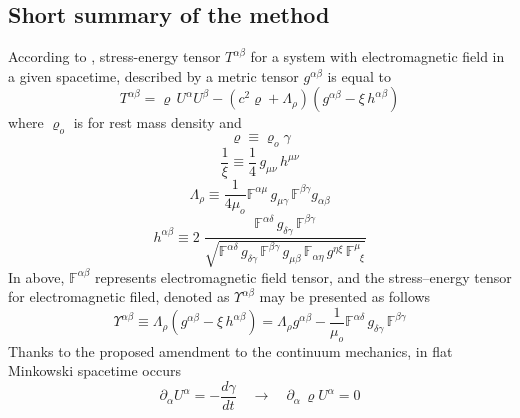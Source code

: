 \documentclass[aps,prx,preprint,groupedaddress,showkeys]{revtex4-2}
\newcommand{\mdt}[1] {\frac{d {#1}}{dt}}
\begin{document}
\subsection{Short summary of the method} \label{ShortSummary}

According to \cite{PMofC}, stress-energy tensor $T^{\alpha \beta}$ for a system with electromagnetic field in a given spacetime, described by a metric tensor $g^{\alpha \beta}$ is equal to
\begin{equation} \label{CH2}
T^{\alpha \beta} =  \varrho \, U^{\alpha} U^{\beta} - \left ( c^2 \varrho +  \Lambda_{\rho}  \right ) \left ( g^{\alpha \beta} - \xi \, h^{\alpha \beta} \right )
\end{equation}
where $\varrho_o$ is for rest mass density and
\begin{equation} \label{VRD}
\varrho \equiv \varrho_o \gamma
\end{equation}
\begin{equation} \label{CH4}
\frac{1}{\xi} \equiv \frac{1}{4}\, g_{\mu \nu} \, h^{\mu \nu}
\end{equation}
\begin{equation} \label{CH5}
\Lambda_{\rho} \equiv \frac{1}{4\mu_o} \mathbb{F}^{\alpha \mu} \, g_{\mu \gamma} \, \mathbb{F}^{ \beta \gamma } g_{\alpha \beta}
\end{equation}
\begin{equation} \label{CH6}
h^{\alpha \beta} \equiv 2 \; \frac{\mathbb{F}^{\alpha \delta} \, g_{\delta \gamma} \, \mathbb{F}^{ \beta \gamma } }{ \sqrt{\mathbb{F}^{\alpha \delta} \, g_{\delta \gamma} \, \mathbb{F}^{ \beta \gamma } \, g_{\mu \beta} \, \mathbb{F}_{\alpha \eta} \, g^{\eta \xi} \, \mathbb{F}^{\mu}_{\; \; \xi }}}
\end{equation}
In above, $\mathbb{F}^{\alpha \beta}$ represents electromagnetic field tensor, and the stress–energy tensor for electromagnetic filed, denoted as $\Upsilon^{\alpha \beta}$ may be presented as follows
\begin{equation} \label{CH7}
\Upsilon^{\alpha \beta} \equiv  \Lambda_{\rho} \left (g^{\alpha \beta} - \xi \, h^{\alpha \beta}  \right ) = \Lambda_{\rho} g^{\alpha \beta} - \frac{1}{\mu_o}\mathbb{F}^{\alpha \delta} \, g_{\delta \gamma} \, \mathbb{F}^{ \beta \gamma }
\end{equation}
Thanks to the proposed amendment to the continuum mechanics, in flat Minkowski spacetime occurs
\begin{equation} \label{CH1}
\partial_{\alpha} U^{\alpha} = -\mdt{\gamma}  \quad \to \quad \partial_{\alpha} \, \varrho U^{\alpha} = 0
\end{equation}
\end{document}
